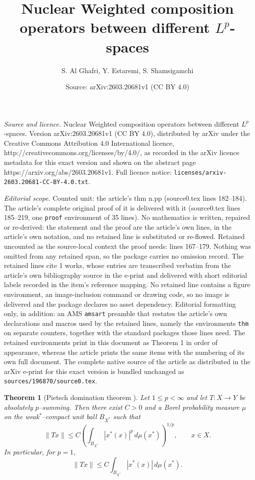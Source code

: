 \documentclass[10pt,a4paper]{amsart}
\title{Nuclear Weighted composition operators between different $L^p$-spaces}
\author{S. Al Ghafri, Y. Estaremi, S. Shamsigamchi}
\date{Source: arXiv:2603.20681v1 (CC BY 4.0)}
\newtheorem{thm}{Theorem}
\begin{document}
\maketitle

\noindent\emph{Source and licence.} Nuclear Weighted composition operators between different $L^p$-spaces. Version arXiv:2603.20681v1 (CC BY 4.0), distributed by arXiv under the Creative Commons Attribution 4.0 International licence, http://creativecommons.org/licenses/by/4.0/, as recorded in the arXiv licence metadata for this exact version and shown on the abstract page https://arxiv.org/abs/2603.20681v1. Full licence notice: \texttt{licenses/arxiv-2603.20681-CC-BY-4.0.txt}.\par\smallskip

\noindent\textit{Editorial scope.} Counted unit: the article's thm n.pp (source0.tex lines 182--184). The article's complete original proof of it is delivered with it (source0.tex lines 185--219, one \texttt{proof} environment of 35 lines). No mathematics is written, repaired or re-derived: the statement and the proof are the article's own lines, in the article's own notation, and no retained line is substituted or re-flowed.  Retained uncounted as the source-local context the proof needs: lines 167--179.  Nothing was omitted from any retained span, so the package carries no omission record.  The retained lines cite 1 works, whose entries are transcribed verbatim from the article's own bibliography source in the e-print and delivered with short editorial labels recorded in the item's reference mapping.  No retained line contains a figure environment, an image-inclusion command or drawing code, so no image is delivered and the package declares no asset dependency.  Editorial formatting only, in addition: an AMS \texttt{amsart} preamble that restates the article's own declarations and macros used by the retained lines, namely the environments \texttt{thm} on separate counters, together with the standard packages those lines need.  The retained environments print in this document as Theorem 1 in order of appearance, whereas the article prints the same items with the numbering of its own full document.  The complete native source of the article as distributed in the arXiv e-print for this exact version is bundled unchanged as \texttt{sources/196870/source0.tex}.
\begin{thm}[Pietsch domination theorem {\cite[Theorem~2.12]{dj}}]\label{thm:Pietsch}
Let $1\le p<\infty$ and let $T:X\to Y$ be absolutely $p$--summing.
Then there exist $C>0$ and a Borel probability measure $\mu$ on the weak$^{*}$--compact unit ball $B_{X^*}$ such that
\[
\|Tx\|
\le C\left(\int_{B_{X^*}} |x^*(x)|^p\,d\mu(x^*)\right)^{1/p},
\qquad x\in X.
\]
In particular, for $p=1$,
\[
\|Tx\|\le C\int_{B_{X^*}} |x^*(x)|\,d\mu(x^*).
\]
\end{thm}
\end{document}
